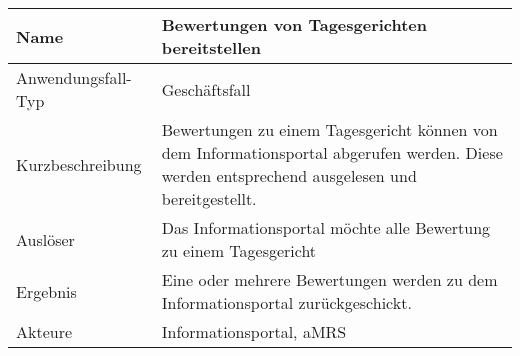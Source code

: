\begin{table}[H]
    \centering
    \label{bewertungenbereitstellen}
    \begin{tabularx}{\textwidth}{| l | X |}
        \hline
        Name               & Bewertungen von Tagesgerichten bereitstellen                                                                                                   \\
        \hline
        Anwendungsfall-Typ & Geschäftsfall                                                                                                                                  \\
        \hline
        Kurzbeschreibung   & Bewertungen zu einem Tagesgericht können von dem Informationsportal abgerufen werden. Diese werden entsprechend ausgelesen und bereitgestellt. \\
        \hline
        Auslöser           & Das Informationsportal möchte alle Bewertung zu einem Tagesgericht                                                                             \\
        \hline
        Ergebnis           & Eine oder mehrere Bewertungen werden zu dem Informationsportal zurückgeschickt.                                                                \\
        \hline
        Akteure            & Informationsportal, \ac{aMRS}                                                                                                                  \\
        \hline
    \end{tabularx}
\end{table}

